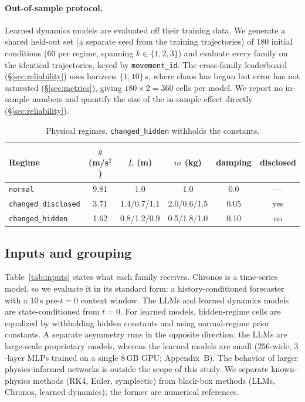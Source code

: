 \documentclass{article}
\begin{document}
\paragraph{Out-of-sample protocol.} Learned dynamics models are evaluated off their training
data. We generate a shared held-out set (a separate seed from the training trajectories) of
$180$ initial conditions ($60$ per regime, spanning $k\in\{1,2,3\}$) and evaluate every
family on the identical trajectories, keyed by \texttt{movement\_id}. The cross-family
leaderboard (\S\ref{sec:reliability}) uses horizons $\{1,10\}$\,s, where chaos has begun but
error has not saturated (\S\ref{sec:metrics}), giving $180\times2=360$ cells per model. We
report no in-sample numbers and quantify the size of the in-sample effect directly
(\S\ref{sec:reliability}).

\begin{table}[tbp]
\centering\small
\caption{Physical regimes. \texttt{changed\_hidden} withholds the constants.}
\label{tab:regimes}
\begin{tabular}{lccccc}
\toprule
Regime & $g$ (m/s$^2$) & $L$ (m) & $m$ (kg) & damping & disclosed \\
\midrule
\texttt{normal} & 9.81 & 1.0 & 1.0 & 0.0 & --- \\
\texttt{changed\_disclosed} & 3.71 & 1.4/0.7/1.1 & 2.0/0.6/1.5 & 0.05 & yes \\
\texttt{changed\_hidden} & 1.62 & 0.8/1.2/0.9 & 0.5/1.8/1.0 & 0.10 & no \\
\bottomrule
\end{tabular}
\end{table}

\subsection{Inputs and grouping}
\label{sec:inputs}
Table~\ref{tab:inputs} states what each family receives. Chronos is a time-series model, so
we evaluate it in its standard form: a history-conditioned forecaster with a $10$\,s
pre-$t{=}0$ context window. The LLMs and learned dynamics models are state-conditioned from
$t{=}0$. For learned models, hidden-regime cells are equalized by withholding hidden constants
and using normal-regime prior constants. A separate asymmetry runs in the opposite direction:
the LLMs are large-scale proprietary models, whereas the learned models are small
($256$-wide, $3$-layer MLPs trained on a single $8$\,GB GPU; Appendix~B). The behavior of
larger physics-informed networks is outside the scope of this study. We separate
known-physics methods (RK4, Euler, symplectic) from black-box methods (LLMs, Chronos,
learned dynamics); the former are numerical references.
\end{document}
